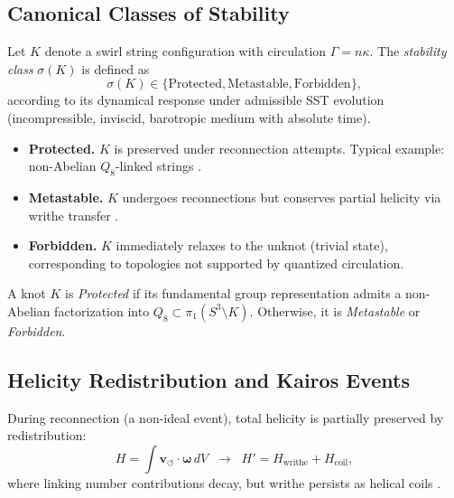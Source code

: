 \documentclass[10pt,reprint,aps,onecolumn,nofootinbib]{revtex4-2}
\begin{document}
    \subsection{Canonical Classes of Stability}

    \begin{definition}
        Let $K$ denote a swirl string configuration with circulation $\Gamma = n \kappa$. The \emph{stability class} $\sigma(K)$ is defined as
        \[
            \sigma(K) \in \{ \text{Protected}, \text{Metastable}, \text{Forbidden} \},
        \]
        according to its dynamical response under admissible SST evolution (incompressible, inviscid, barotropic medium with absolute time).
    \end{definition}

    \begin{itemize}
        \item \textbf{Protected.} $K$ is preserved under reconnection attempts. Typical example: non-Abelian $Q_8$-linked strings \cite{Annala2025}.
        \item \textbf{Metastable.} $K$ undergoes reconnections but conserves partial helicity via writhe transfer \cite{Kleckner2016}.
        \item \textbf{Forbidden.} $K$ immediately relaxes to the unknot (trivial state), corresponding to topologies not supported by quantized circulation.
    \end{itemize}

    \begin{corollary}
        A knot $K$ is \emph{Protected} if its fundamental group representation admits a non-Abelian factorization into $Q_8 \subset \pi_1(S^3 \setminus K)$. Otherwise, it is \emph{Metastable} or \emph{Forbidden}.
    \end{corollary}

    \subsection{Helicity Redistribution and Kairos Events}

    \begin{axiom}
        During reconnection (a non-ideal event), total helicity is partially preserved by redistribution:
        \[
            H = \int \mathbf{v}_{\!\boldsymbol{\circlearrowleft}} \cdot \boldsymbol{\omega}\, dV
            \;\;\longrightarrow\;\;
            H' = H_{\text{writhe}} + H_{\text{coil}} ,
        \]
        where linking number contributions decay, but writhe persists as helical coils \cite{Ricca1996,Kleckner2016}.
    \end{axiom}
\end{document}

